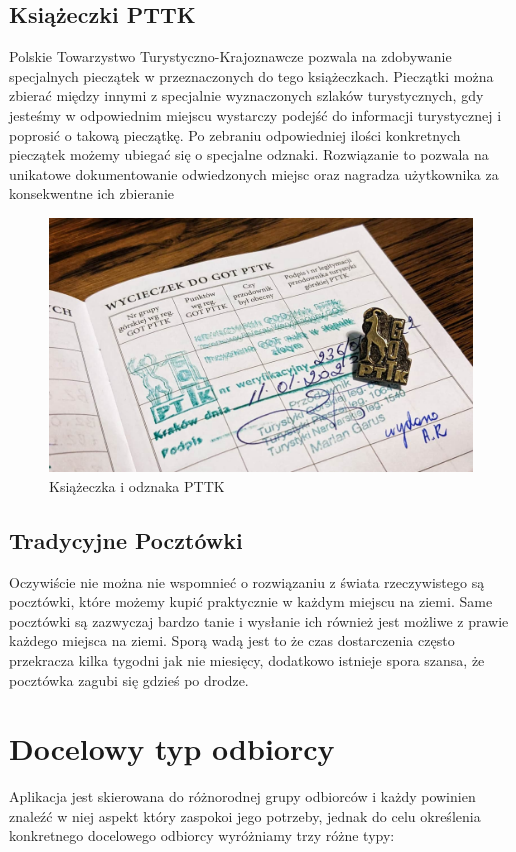 \documentclass[a4paper,twoside,12pt]{book}
\begin{document}
\subsection{Książeczki PTTK}
Polskie Towarzystwo Turystyczno-Krajoznawcze pozwala na zdobywanie specjalnych pieczątek w przeznaczonych do tego książeczkach. Pieczątki można zbierać między innymi z specjalnie wyznaczonych szlaków turystycznych, gdy jesteśmy w odpowiednim miejscu wystarczy podejść do informacji turystycznej i poprosić o takową pieczątkę. Po zebraniu odpowiedniej ilości konkretnych pieczątek możemy ubiegać się o specjalne odznaki. Rozwiązanie to pozwala na unikatowe dokumentowanie odwiedzonych miejsc oraz nagradza użytkownika za konsekwentne ich zbieranie
\begin{figure}[H]
    \centering
    \includegraphics[width=1\textwidth]{apki_ss/pttk.jpg}
    \caption{Książeczka i odznaka PTTK}
\end{figure}

\subsection{Tradycyjne Pocztówki}
Oczywiście nie można nie wspomnieć o rozwiązaniu z świata rzeczywistego są pocztówki, które możemy kupić praktycznie w każdym miejscu na ziemi. Same pocztówki są zazwyczaj bardzo tanie i wysłanie ich również jest możliwe z prawie każdego miejsca na ziemi. Sporą wadą jest to że czas dostarczenia często przekracza kilka tygodni jak nie miesięcy, dodatkowo istnieje spora szansa, że pocztówka zagubi się gdzieś po drodze.

\newpage
\section{Docelowy typ odbiorcy}
Aplikacja jest skierowana do różnorodnej grupy odbiorców i każdy powinien znaleźć w niej aspekt który zaspokoi jego potrzeby, jednak do celu określenia konkretnego docelowego odbiorcy wyróżniamy trzy różne typy:
\end{document}
